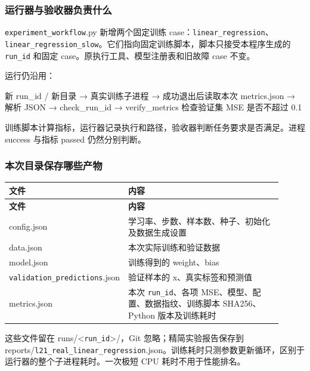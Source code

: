 \documentclass[UTF8,zihao=-4,fontset=fandol]{ctexart}
\begin{document}
\subsubsection{运行器与验收器负责什么}

\nolinkurl{experiment_workflow}.py 新增两个固定训练 case：\nolinkurl{linear_regression}、\nolinkurl{linear_regression_slow}。它们指向固定训练脚本，脚本只接受本程序生成的 \nolinkurl{run_id} 和固定 case。原执行工具、模型注册表和旧故障 case 不变。

运行仍沿用：

\begin{Code}
新 run_id / 新目录
  → 真实训练子进程
  → 成功退出后读取本次 metrics.json
  → 解析 JSON
  → check_run_id
  → verify_metrics 检查验证集 MSE 是否不超过 0.1
\end{Code}

训练脚本计算指标，运行器记录执行和路径，验收器判断任务要求是否满足。进程 success 与指标 passed 仍然分别判断。

\subsubsection{本次目录保存哪些产物}

{\small\setlength{\tabcolsep}{4pt}
\renewcommand{\arraystretch}{1.25}
\begin{longtable}{>{\raggedright\arraybackslash}p{0.28\linewidth}>{\raggedright\arraybackslash}p{0.63\linewidth}}
\toprule
\textbf{文件} & \textbf{内容} \\
\midrule\endfirsthead
\toprule
\textbf{文件} & \textbf{内容} \\
\midrule\endhead
\bottomrule\endfoot
config.json & 学习率、步数、样本数、种子、初始化及数据生成设置 \\
data.json & 本次实际训练和验证数据 \\
model.json & 训练得到的 weight、bias \\
\nolinkurl{validation_predictions}.json & 验证样本的 x、真实标签和预测值 \\
metrics.json & 本次 \nolinkurl{run_id}、各项 MSE、模型、配置、数据指纹、训练脚本 SHA256、Python 版本及训练耗时 \\
\end{longtable}}

这些文件留在 runs/<\nolinkurl{run_id}>/，Git 忽略；精简实验报告保存到 reports/\nolinkurl{l21_real_linear_regression}.json。训练耗时只测参数更新循环，区别于运行器的整个子进程耗时。一次极短 CPU 耗时不用于性能排名。
\end{document}
